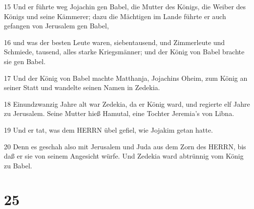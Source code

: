 \par 15 Und er führte weg Jojachin gen Babel, die Mutter des Königs, die Weiber des Königs und seine Kämmerer; dazu die Mächtigen im Lande führte er auch gefangen von Jerusalem gen Babel,
\par 16 und was der besten Leute waren, siebentausend, und Zimmerleute und Schmiede, tausend, alles starke Kriegsmänner; und der König von Babel brachte sie gen Babel.
\par 17 Und der König von Babel machte Matthanja, Jojachins Oheim, zum König an seiner Statt und wandelte seinen Namen in Zedekia.
\par 18 Einundzwanzig Jahre alt war Zedekia, da er König ward, und regierte elf Jahre zu Jerusalem. Seine Mutter hieß Hamutal, eine Tochter Jeremia's von Libna.
\par 19 Und er tat, was dem HERRN übel gefiel, wie Jojakim getan hatte.
\par 20 Denn es geschah also mit Jerusalem und Juda aus dem Zorn des HERRN, bis daß er sie von seinem Angesicht würfe. Und Zedekia ward abtrünnig vom König zu Babel.

\chapter{25}

